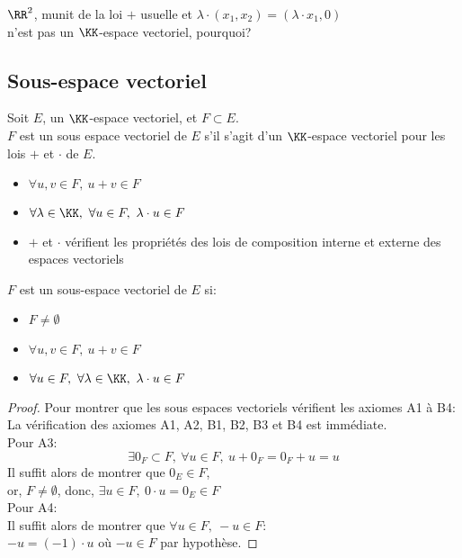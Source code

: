 \documentclass[../main.tex]{subfile}
\begin{document}
\begin{rema}
	$\RR^2$, munit de la loi $+$ usuelle et $\lambda \cdot (x_1, x_2) = (\lambda \cdot x_1, 0)$\\
	n'est pas un $\KK$-espace vectoriel, pourquoi?
\end{rema}

\subsection{Sous-espace vectoriel}

\begin{defi}
	Soit $E$, un $\KK$-espace vectoriel, et $F \subset E$.\\
	$F$ est un sous espace vectoriel de $E$ s'il s'agit d'un $\KK$-espace vectoriel pour les lois $+$ et $\cdot$ de $E$.
\begin{itemize}
	\item $\forall u, v \in F, \ u + v \in F$
	\item $\forall \lambda \in \KK, \ \forall u \in F, \ \lambda \cdot u \in F$
	\item $+$ et $\cdot$ vérifient les propriétés des lois de composition interne et externe des espaces vectoriels
\end{itemize}
\end{defi}

\begin{propri}
	$F$ est un sous-espace vectoriel de $E$ si:
\begin{itemize}
	\item $F \neq \emptyset$
	\item $\forall u, v \in F, \ u+v \in F$
	\item $\forall u \in F, \ \forall \lambda \in \KK, \ \lambda \cdot u \in F$
\end{itemize}
\end{propri}

\begin{proof}
	Pour montrer que les sous espaces vectoriels vérifient les axiomes A1 à B4:\\
	La vérification des axiomes A1, A2, B1, B2, B3 et B4 est immédiate.\\
	Pour A3:\\
	$$\exists 0_F \subset F, \ \forall u \in F, \ u+0_F = 0_F + u = u$$
	Il suffit alors de montrer que $0_E \in F$, \\
	or, $F \neq \emptyset$, donc, $\exists u \in F, \ 0 \cdot u = 0_E \in F$\\

	Pour A4:\\
	Il suffit alors de montrer que $\forall u \in F, \ -u \in F$:\\
	$-u = (-1) \cdot u$ où $-u \in F$ par hypothèse.
\end{proof}
\end{document}
